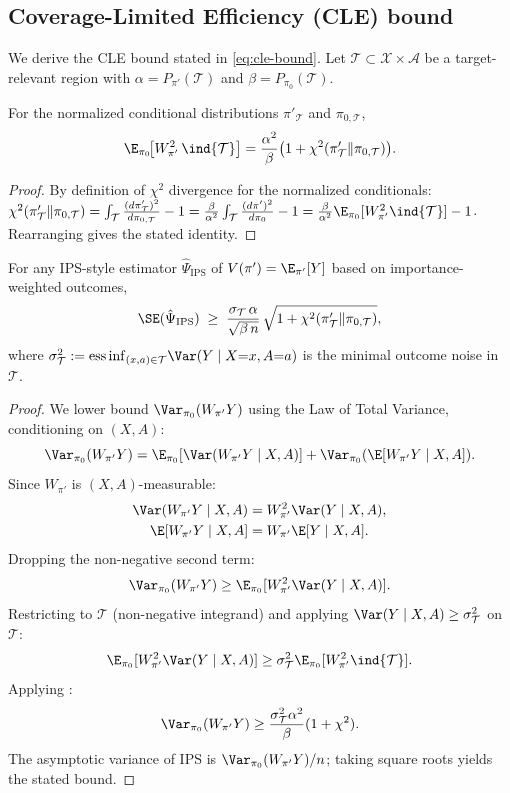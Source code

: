 \subsection{Coverage-Limited Efficiency (CLE) bound}
\label{app:proof-cle}

We derive the CLE bound stated in \cref{eq:cle-bound}. Let $\mathcal{T} \subset \mathcal{X} \times \mathcal{A}$ be a target-relevant region with $\alpha = P_{\pi'}(\mathcal{T})$ and $\beta = P_{\pi_0}(\mathcal{T})$.

\begin{lemma}
\label{lem:weight-identity}
For the normalized conditional distributions $\pi'_{\mathcal{T}}$ and $\pi_{0,\mathcal{T}}$,
\[
\E_{\pi_0}\!\big[W_{\pi'}^2\, \ind{\mathcal{T}}\big] = \frac{\alpha^2}{\beta}\bigl(1 + \chi^2(\pi'_{\mathcal{T}} \| \pi_{0,\mathcal{T}})\bigr).
\]
\end{lemma}
\begin{proof}
By definition of $\chi^2$ divergence for the normalized conditionals:
$\chi^2(\pi'_{\mathcal{T}} \| \pi_{0,\mathcal{T}}) = \int_{\mathcal{T}} \frac{(d\pi'_{\mathcal{T}})^2}{d\pi_{0,\mathcal{T}}} - 1
= \frac{\beta}{\alpha^2} \int_{\mathcal{T}} \frac{(d\pi')^2}{d\pi_0} - 1
= \frac{\beta}{\alpha^2} \E_{\pi_0}[W_{\pi'}^2 \ind{\mathcal{T}}] - 1$.
Rearranging gives the stated identity.
\end{proof}

\begin{proposition}
\label{prop:cle}
For any IPS-style estimator $\hat\Psi_{\mathrm{IPS}}$ of $V(\pi') = \E_{\pi'}[Y]$ based on importance-weighted outcomes,
\[
\SE(\hat\Psi_{\mathrm{IPS}}) \;\ge\; \frac{\sigma_{\mathcal{T}}\, \alpha}{\sqrt{\beta\, n}}\, \sqrt{1 + \chi^2(\pi'_{\mathcal{T}} \| \pi_{0,\mathcal{T}})},
\]
where $\sigma_{\mathcal{T}}^2 := \mathrm{ess\,inf}_{(x,a)\in \mathcal{T}} \Var(Y \mid X{=}x, A{=}a)$ is the minimal outcome noise in $\mathcal{T}$.
\end{proposition}

\begin{proof}
We lower bound $\Var_{\pi_0}(W_{\pi'} Y)$ using the Law of Total Variance, conditioning on $(X,A)$:
\[
\Var_{\pi_0}(W_{\pi'} Y) = \E_{\pi_0}[\Var(W_{\pi'} Y \mid X,A)] + \Var_{\pi_0}(\E[W_{\pi'} Y \mid X,A]).
\]
Since $W_{\pi'}$ is $(X,A)$-measurable:
\begin{align*}
\Var(W_{\pi'} Y \mid X,A) &= W_{\pi'}^2 \Var(Y \mid X,A), \\
\E[W_{\pi'} Y \mid X,A] &= W_{\pi'} \E[Y \mid X,A].
\end{align*}
Dropping the non-negative second term:
\[
\Var_{\pi_0}(W_{\pi'} Y) \ge \E_{\pi_0}[W_{\pi'}^2 \Var(Y \mid X,A)].
\]
Restricting to $\mathcal{T}$ (non-negative integrand) and applying $\Var(Y \mid X,A) \ge \sigma_{\mathcal{T}}^2$ on $\mathcal{T}$:
\[
\E_{\pi_0}[W_{\pi'}^2 \Var(Y \mid X,A)] \ge \sigma_{\mathcal{T}}^2 \E_{\pi_0}[W_{\pi'}^2 \ind{\mathcal{T}}].
\]
Applying :
\[
\Var_{\pi_0}(W_{\pi'} Y) \ge \frac{\sigma_{\mathcal{T}}^2 \alpha^2}{\beta}(1 + \chi^2).
\]
The asymptotic variance of IPS is $\Var_{\pi_0}(W_{\pi'} Y)/n$; taking square roots yields the stated bound.
\end{proof}

